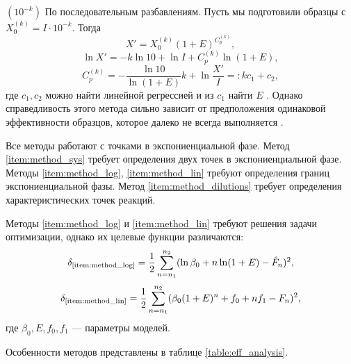 \begin{labeldesc}
  \item[$(10^{-k})$]\label{item:method_dilutions}
  По последовательным разбавлениям. Пусть мы подготовили образцы с
  $X_0^{(k)}=I\cdot 10^{-k}$. Тогда
  \[
    X'=X_0^{(k)}(1+E)^{C_{p}^{(k)}},
  \]
  \[
    \ln X' = -k\ln 10 + \ln I + C_{p}^{(k)}\ln (1+E),
  \]
  \[
    C_{p}^{(k)}=-\frac{\ln 10}{\ln (1+E)}k+\ln\frac{X'}{I}=:kc_1+c_2,
  \]
  где $c_1,c_2$ можно найти линейной регрессией и из $c_1$ найти $E$
  \cite{rasmussenQuantificationLightCycler2001}. Однако справедливость
  этого метода сильно зависит от предположения одинаковой эффективности
  образцов, которое далеко не всегда выполняется
  \cite{ramakersAssumptionfreeAnalysisQuantitative2003}.
\end{labeldesc}

Все методы работают с точками в экспониенциальной фазе. Метод
\ref{item:method_sys} требует определения двух точек в экспониенциальной фазе.
Методы \ref{item:method_log}, \ref{item:method_lin} требуют определения границ
экспониенциальной фазы. Метод \ref{item:method_dilutions} требует определения
характеристических точек реакций.

Методы \ref{item:method_log} и \ref{item:method_lin} требуют решения задачи
оптимизации, однако их целевые функции различаются:
\[
  \delta_{\text{\ref{item:method_log}}}=\frac{1}{2}\sum_{n=n_1}^{n_2}(\ln \beta_0+n\ln(1+E)-\hat F_{n})^{2},
\]
\[
  \delta_{\text{\ref{item:method_lin}}}=\frac{1}{2}\sum_{n=n_1}^{n_2}(\beta_0(1+E)^{n}+f_0+nf_1-F_{n})^{2},
\]
где $\beta_0,E,f_0,f_1$ --- параметры моделей.

Особенности методов представлены в таблице \ref{table:eff_analysis}.

